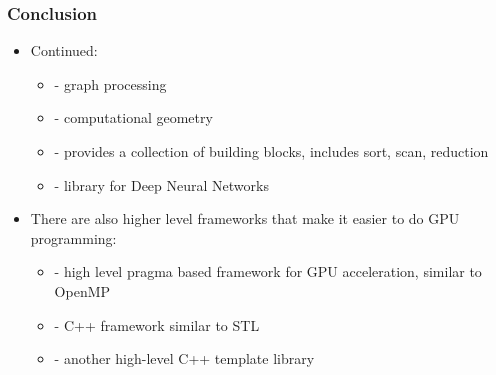 \begin{frame}[fragile]
  \frametitle{Conclusion}
\begin{itemize}
\item Continued:
\begin{itemize}
    \item {} - graph processing
    \item {} - computational geometry 
    \item {} - provides a collection of building blocks, includes sort, scan, reduction
    \item {} - library for Deep Neural Networks
\end{itemize}
\item There are also higher level frameworks that make it easier to do GPU programming:
  \begin{itemize}
  \item {} - high level pragma based framework for GPU acceleration, similar to OpenMP
  \item {} - C++ framework similar to STL
  \item {} - another high-level C++ template library
  \end{itemize}
\end{itemize}
\end{frame}